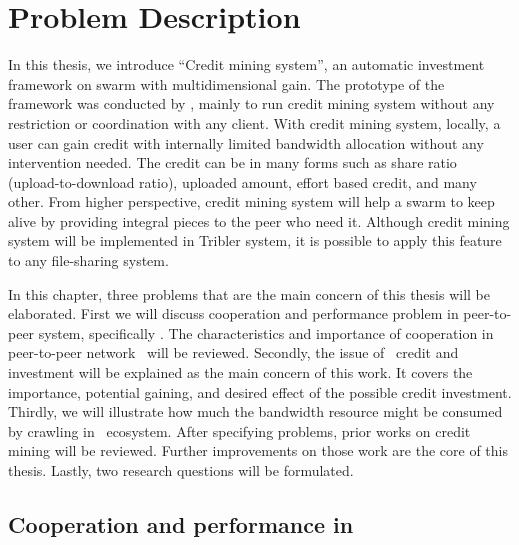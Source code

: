 \chapter{Problem Description}
\label{chp:relwork}
In this thesis, we introduce ``Credit mining system'', an automatic investment framework on swarm with multidimensional gain. The prototype of the framework was conducted by \citeauthor{2015:creditmining:capota}, mainly to run credit mining system without any restriction or coordination with any client. With credit mining system, locally, a user can gain credit with internally limited bandwidth allocation without any intervention needed. The credit can be in many forms such as share ratio (upload-to-download ratio), uploaded amount, effort based credit, and many other. From higher perspective, credit mining system will help a swarm to keep alive by providing integral pieces to the peer who need it. Although credit mining system will be implemented in Tribler system, it is possible to apply this feature to any file-sharing system.

In this chapter, three problems that are the main concern of this thesis will be elaborated. First we will discuss cooperation and performance problem in peer-to-peer system, specifically \bt. The characteristics and importance of cooperation in peer-to-peer network \bt~will be reviewed. Secondly, the issue of \bt~credit and investment will be explained as the main concern of this work. It covers the importance, potential gaining, and desired effect of the possible credit investment. Thirdly, we will illustrate how much the bandwidth resource might be consumed by crawling in \bt~ecosystem. After specifying problems, prior works on credit mining will be reviewed. Further improvements on those work are the core of this thesis. Lastly, two research questions will be formulated.

\section{Cooperation and performance in \bt}

